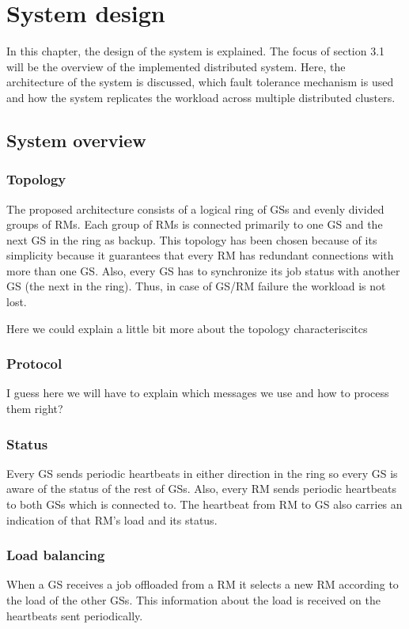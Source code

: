 \section{System design}
In this chapter, the design of the system is explained.
The focus of section 3.1 will be the overview of the implemented distributed system.
Here, the architecture of the system is discussed, which fault tolerance mechanism is used and how the system replicates the workload across multiple distributed clusters.

\subsection{System overview}


\subsubsection{Topology}
The proposed architecture consists of a logical ring of GSs and evenly divided groups of RMs.
Each group of RMs is connected primarily to one GS and the next GS in the ring as backup. This topology has been chosen because of its 
simplicity because it guarantees that every RM has redundant connections with more than one GS. Also, every GS has to synchronize its job status with another GS (the next in the ring). Thus, in case of GS/RM failure the workload is not lost.

Here we could explain a little bit more about the topology characteriscitcs
 

\subsubsection{Protocol}
I guess here we will have to explain which messages we use and how to process them right? 

\subsubsection{Status}
Every GS sends periodic heartbeats in either direction in the ring so every GS is aware of the status of the rest of GSs. Also, %
every RM sends periodic heartbeats to both GSs which is connected to.
The heartbeat from RM to GS also carries an indication of that RM's load and its status.

\subsubsection{Load balancing}
When a GS receives a job offloaded from a RM it selects a new RM according to the load of the other GSs. This information about the load is received on the heartbeats sent periodically.

